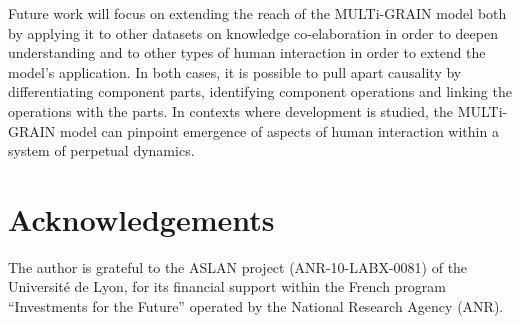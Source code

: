 \documentclass[output=paper]{langscibook}
\begin{document}
Future work will focus on extending the reach of the MULTi-GRAIN model both by applying it to other datasets on knowledge co-elaboration in order to deepen understanding and to other types of human interaction in order to extend the model’s application. In both cases, it is possible to pull apart causality by differentiating component parts, identifying component operations and linking the operations with the parts. In contexts where development is studied, the MULTi-GRAIN model can pinpoint emergence of aspects of human interaction within a system of perpetual dynamics.

\section*{Acknowledgements}
The author is grateful to the ASLAN project (ANR-10-LABX-0081) of the Université de Lyon, for its financial support within the French program “Investments for the Future” operated by the National Research Agency (ANR).

{\sloppy\printbibliography[heading=subbibliography,notkeyword=this]}
\end{document}
